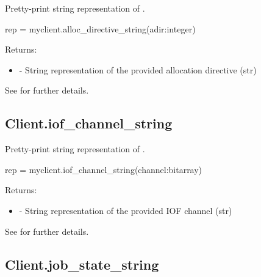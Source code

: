 \summary

Pretty-print string representation of .

\format

\pyspecificstart
\begin{codepar}
rep = myclient.alloc_directive_string(adir:integer)
\end{codepar}
\pyspecificend

\begin{arglist}
\end{arglist}

Returns:
\begin{itemize}
    \item {} - String representation of the provided allocation directive (str)
\end{itemize}

See  for further details.


\subsection{Client.iof_channel_string}

\summary

Pretty-print string representation of .

\format

\pyspecificstart
\begin{codepar}
rep = myclient.iof_channel_string(channel:bitarray)
\end{codepar}
\pyspecificend

\begin{arglist}
\end{arglist}

Returns:
\begin{itemize}
    \item {} - String representation of the provided IOF channel (str)
\end{itemize}

See  for further details.


\subsection{Client.job_state_string}


